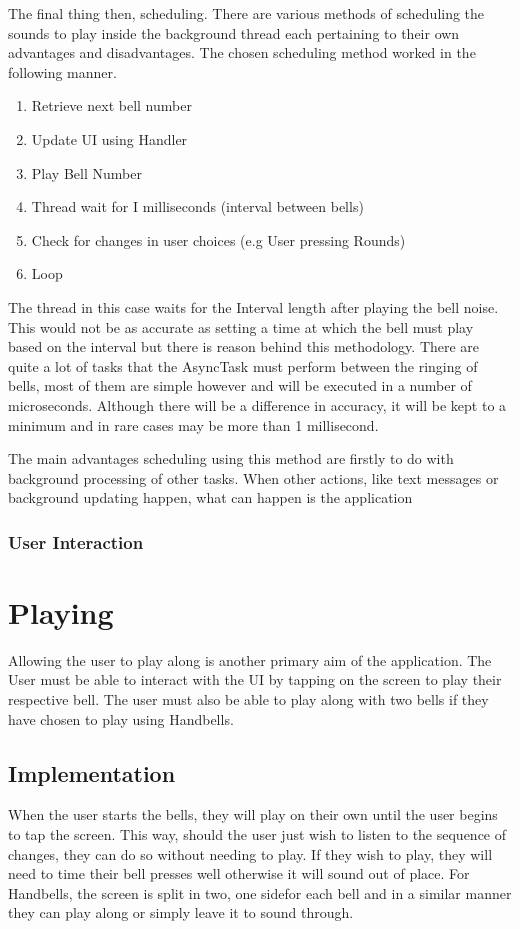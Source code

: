 \documentclass{l4proj}
\begin{document}
The final thing then, scheduling.  There are various methods of scheduling the sounds to play inside the background thread each pertaining to their own advantages and disadvantages.  The  chosen scheduling method worked in the following manner. 

\begin{enumerate}
\item Retrieve next bell number
\item Update UI using Handler
\item Play Bell Number
\item Thread wait for I milliseconds (interval between bells)
\item Check for changes in user choices (e.g User pressing Rounds)
\item Loop
\end{enumerate}

The thread in this case waits for the Interval length after playing the bell noise.  This would not be as accurate as setting a time at which the bell must play based on the interval but there is reason behind this methodology.  There are quite a lot of tasks that the AsyncTask must perform between the ringing of bells, most of them are simple however and will be executed in a number of microseconds.  Although there will be a difference in accuracy, it will be kept to a minimum and in rare cases may be more than 1 millisecond.

The main advantages scheduling using this method are firstly to do with background processing of other tasks.  When other actions, like text messages or background updating happen, what can happen is the application

\subsubsection{User Interaction}

\section{Playing}
Allowing the user to play along is another primary aim of the application.  The User must be able to interact with the UI by tapping on the screen to play their respective bell.  The user must also be able to play along with two bells if they have chosen to play using Handbells.

\subsection{Implementation}
When the user starts the bells, they will play on their own until  the user begins to tap the screen.  This way, should the user just wish to listen to the sequence of changes, they can do so without needing to play.  If they wish to play, they will need to  time their bell presses well otherwise it will sound out of place.  For Handbells, the screen is split in two, one sidefor each bell and in a similar manner they can play along or simply leave it to sound through.  
\end{document}
